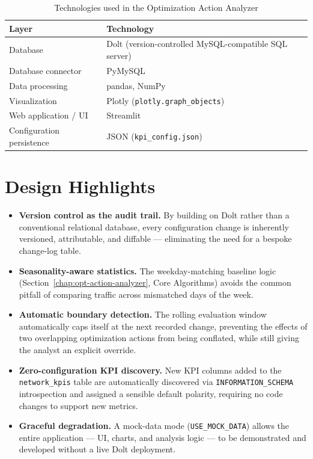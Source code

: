 \begin{table}[H] %
    \centering
    \caption{Technologies used in the Optimization Action Analyzer}
    \label{tab:stack}
    \begin{tabular}{@{}ll@{}}
        \toprule
        \textbf{Layer} & \textbf{Technology} \\
        \midrule
        Database                 & Dolt (version-controlled MySQL-compatible SQL server) \\
        Database connector      & PyMySQL \\
        Data processing          & pandas, NumPy \\
        Visualization            & Plotly (\texttt{plotly.graph\_objects}) \\
        Web application / UI     & Streamlit \\
        Configuration persistence & JSON (\texttt{kpi\_config.json}) \\
        \bottomrule
    \end{tabular}
\end{table}

\section{Design Highlights}
\begin{itemize}
    \item \textbf{Version control as the audit trail.} By building on
        Dolt rather than a conventional relational database, every
        configuration change is inherently versioned, attributable, and
        diffable --- eliminating the need for a bespoke change-log
        table.
    \item \textbf{Seasonality-aware statistics.} The weekday-matching
        baseline logic (Section~\ref{chap:opt-action-analyzer}, Core
        Algorithms) avoids the common pitfall of comparing traffic across
        mismatched days of the week.
    \item \textbf{Automatic boundary detection.} The rolling evaluation
        window automatically caps itself at the next recorded change,
        preventing the effects of two overlapping optimization actions
        from being conflated, while still giving the analyst an explicit
        override.
    \item \textbf{Zero-configuration KPI discovery.} New KPI columns
        added to the \texttt{network\_kpis} table are automatically
        discovered via \texttt{INFORMATION\_SCHEMA} introspection and
        assigned a sensible default polarity, requiring no code changes
        to support new metrics.
    \item \textbf{Graceful degradation.} A mock-data mode
        (\texttt{USE\_MOCK\_DATA}) allows the entire application --- UI,
        charts, and analysis logic --- to be demonstrated and developed
        without a live Dolt deployment.
\end{itemize}

